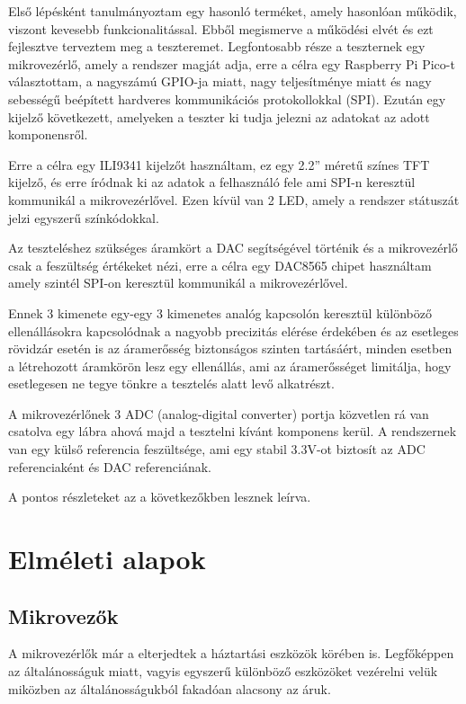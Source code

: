 Első lépésként tanulmányoztam egy hasonló terméket, amely hasonlóan működik, 
viszont kevesebb funkcionalitással. Ebből megismerve a működési elvét és ezt 
fejlesztve terveztem meg a teszteremet. Legfontosabb része a teszternek egy 
mikrovezérlő, amely a rendszer magját adja, erre a célra egy Raspberry Pi Pico-t 
választottam, a nagyszámú GPIO-ja miatt, nagy teljesítménye miatt és nagy 
sebességű beépített hardveres kommunikációs protokollokkal (SPI). Ezután egy 
kijelző következett, amelyeken a teszter ki tudja jelezni az adatokat az adott 
komponensről. 

Erre a célra egy ILI9341 kijelzőt használtam, ez egy 2.2” méretű 
színes TFT kijelző, és erre íródnak ki az adatok a felhasználó fele ami SPI-n 
keresztül kommunikál a mikrovezérlővel. Ezen kívül  van 2 LED, amely a rendszer 
státuszát jelzi egyszerű színkódokkal. 

Az teszteléshez  szükséges áramkört a DAC segítségével történik és a mikrovezérlő 
csak a feszültség értékeket nézi, erre a célra egy DAC8565 chipet használtam amely 
szintél SPI-on 
keresztül kommunikál a mikrovezérlővel. 

Ennek 3 kimenete egy-egy 3 kimenetes 
analóg kapcsolón keresztül különböző ellenállásokra kapcsolódnak a nagyobb 
precizitás elérése érdekében és az esetleges rövidzár esetén is az áramerősség 
biztonságos szinten tartásáért, minden esetben a létrehozott áramkörön lesz egy 
ellenállás, ami az áramerősséget limitálja, hogy esetlegesen ne tegye tönkre a 
tesztelés alatt levő alkatrészt. 

A mikrovezérlőnek 3 ADC (analog-digital 
converter) portja közvetlen rá van csatolva egy lábra ahová majd a tesztelni kívánt 
komponens kerül. A rendszernek van egy külső referencia feszültsége, ami egy 
stabil 3.3V-ot biztosít az ADC referenciaként és DAC referenciának.

A pontos részleteket az a következőkben lesznek leírva.

\section{Elméleti alapok}

\subsection{Mikrovezők}

A mikrovezérlők már a elterjedtek a háztartási eszközök körében is. Legfőképpen az
általánosságuk miatt, vagyis egyszerű különböző eszközöket vezérelni velük miközben 
az általánosságukból fakadóan alacsony az áruk.

